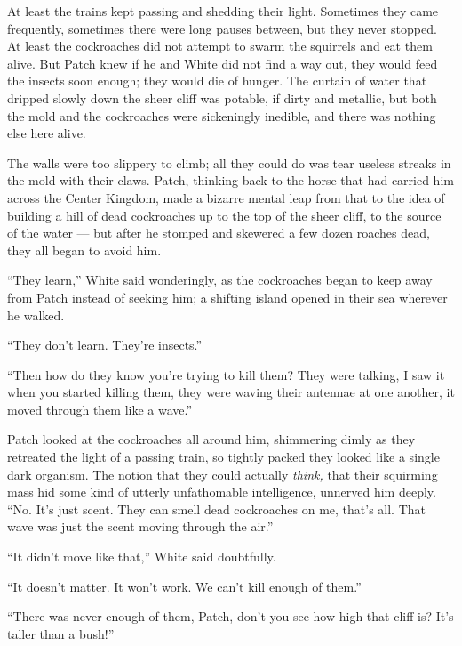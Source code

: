 \documentclass[ebook,oneside,openany,17pt]{memoir}
\newenvironment{tolerant}[1]{%
  \par\tolerance=#1\relax
}{%
  \par
}
\begin{document}
\begin{tolerant}{500}
At least the trains kept passing and shedding their light. Sometimes
they came frequently, sometimes there were long pauses between, but
they never stopped. At least the cockroaches did not attempt to swarm
the squirrels and eat them alive. But Patch knew if he and White did
not find a way out, they would feed the insects soon enough; they
would die of hunger. The curtain of water that dripped slowly down the
sheer cliff was potable, if dirty and metallic, but both the mold and
the cockroaches were sickeningly inedible, and there was nothing else
here alive.
\end{tolerant}

The walls were too slippery to climb; all they could do was tear
useless streaks in the mold with their claws. Patch, thinking back to
the horse that had carried him across the Center Kingdom, made a
bizarre mental leap from that to the idea of building a hill of dead
cockroaches up to the top of the sheer cliff, to the source of the
water — but after he stomped and skewered a few dozen roaches dead,
they all began to avoid him.

“They learn,” White said wonderingly, as the cockroaches began to keep
away from Patch instead of seeking him; a shifting island opened in
their sea wherever he walked.

“They don’t learn. They’re insects.”

\begin{tolerant}{500}
“Then how do they know you’re trying to kill them? They were talking,
I saw it when you started killing them, they were waving their
antennae at one another, it moved through them like a wave.”
\end{tolerant}

Patch looked at the cockroaches all around him, shimmering dimly as
they retreated the light of a passing train, so tightly packed they
looked like a single dark organism. The notion that they could
actually \emph{think,} that their squirming mass hid some kind of
utterly unfathomable intelligence, unnerved him deeply. “No. It’s just
scent. They can smell dead cockroaches on me, that’s all. That wave
was just the scent moving through the air.”

“It didn’t move like that,” White said doubtfully.

“It doesn’t matter. It won’t work. We can’t kill enough of them.”

“There was never enough of them, Patch, don’t you see how high that
cliff is? It’s taller than a bush!”
\end{document}
